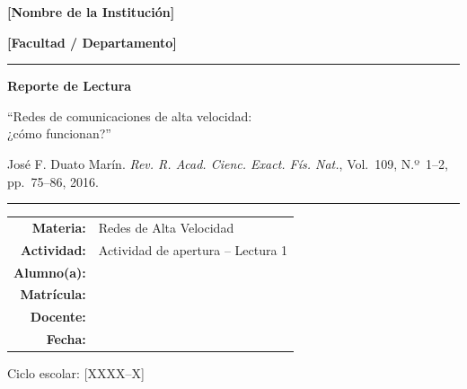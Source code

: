 \documentclass[12pt,a4paper]{article}
\begin{document}
\begin{titlepage}
    \centering
    \vspace*{1cm}
    {\Large\bfseries [Nombre de la Institución]\par}
    \vspace{0.4cm}
    {\large\bfseries [Facultad / Departamento]\par}
    \vspace{1.5cm}
    \noindent\rule{\textwidth}{0.8pt}
    \vspace{1cm}
    {\huge\bfseries Reporte de Lectura\par}
    \vspace{0.7cm}
    {\Large ``Redes de comunicaciones de alta velocidad: \\ ¿cómo funcionan?''\par}
    \vspace{0.6cm}
    {\normalsize José F. Duato Marín. \textit{Rev. R. Acad. Cienc. Exact. Fís. Nat.}, Vol.~109, N.º~1--2, pp.~75--86, 2016.\par}
    \vspace{1cm}
    \noindent\rule{\textwidth}{0.8pt}
    \vspace{1.8cm}

    \begin{tabular}{r l}
        \textbf{Materia:}    & Redes de Alta Velocidad \\[0.35cm]
        \textbf{Actividad:}  & Actividad de apertura -- Lectura 1 \\[0.35cm]
        \textbf{Alumno(a):}  & \underline{\hspace{6.5cm}} \\[0.35cm]
        \textbf{Matrícula:}  & \underline{\hspace{6.5cm}} \\[0.35cm]
        \textbf{Docente:}    & \underline{\hspace{6.5cm}} \\[0.35cm]
        \textbf{Fecha:}      & \underline{\hspace{6.5cm}}
    \end{tabular}

    \vfill
    Ciclo escolar: [XXXX--X]
    \vspace*{0.5cm}
\end{titlepage}
\setcounter{page}{1}

\end{document}
